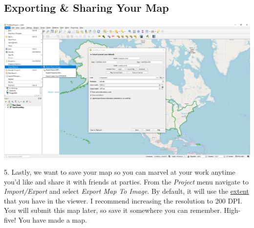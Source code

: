 \documentclass[oneside,a4paper,11pt,explicit]{book}
\begin{document}
\subsection{Exporting \& Sharing Your Map}

\centerline{\includegraphics[width=\textwidth]{Export.png}}

5. Lastly, we want to save your map so you can marvel at your work anytime you'd like and share it with friends at parties. From the \textit{Project} menu navigate to \textit{Import/Export} and select \textit{Export Map To Image}. By default, it will use the \href{https://en.wikipedia.org/wiki/Map_extent}{extent} that you have in the viewer. I recommend increasing the resolution to 200 DPI. You will submit this map later, so save it somewhere you can remember. High-five! You have made a map. 
\end{document}
